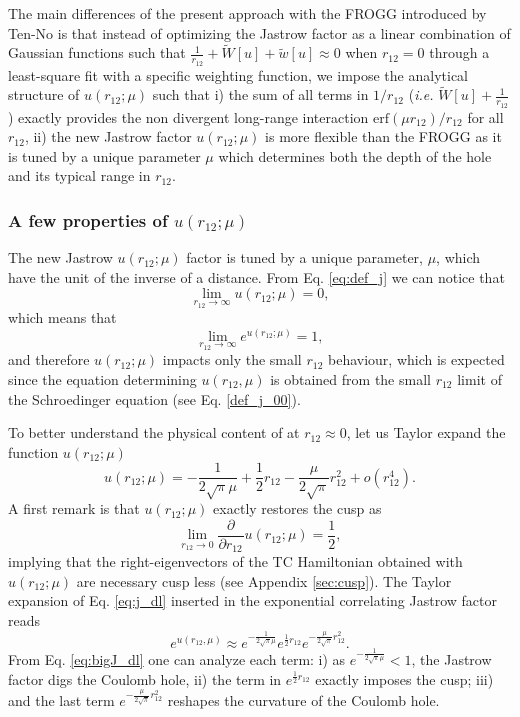 \documentclass[aip,jcp,reprint,noshowkeys,superscriptaddress,twocolumn]{revtex4-1}
\newcommand{\deriv}[3]{\frac{\partial^{#3} #1}{\partial {#2}^{#3}}}
\begin{document}
The main differences of the present approach with the FROGG introduced by Ten-No\cite{TenNo-CPL-00-a} is that instead of optimizing the Jastrow factor as a linear combination of Gaussian functions such that $\frac{1}{r_{12}}  + \tilde{W}[u] + \tilde{w}[u] \approx 0$ when $r_{12}=0$ through a least-square fit with a specific weighting function, 
we impose the analytical structure of $u(r_{12};\mu)$ such that i) the sum of all terms in $1/r_{12}$ (\textit{i.e.} $\tilde{W}[u] + \frac{1}{r_{12}}$) exactly provides the non divergent long-range interaction $\text{erf}(\mu r_{12})/r_{12}$ for all $r_{12}$, 
ii) the new Jastrow factor $u(r_{12};\mu)$ is more flexible than the FROGG as it is tuned by a unique parameter $\mu$ which determines both the depth of the hole and its typical range in $r_{12}$.  

\subsubsection{A few properties of $u(r_{12};\mu)$}
The new Jastrow $u(r_{12};\mu)$ factor is tuned by a unique parameter, $\mu$, which have the unit of the inverse of a distance. 
From Eq. \eqref{eq:def_j} we can notice that 
\begin{equation}
 \lim_{r_{12} \rightarrow \infty}u(r_{12};\mu) = 0,
\end{equation}
which means that 
\begin{equation}
 \lim_{r_{12} \rightarrow \infty}e^{u(r_{12};\mu)} = 1,
\end{equation}
and therefore $u(r_{12};\mu)$ impacts only the small $r_{12}$ behaviour,  
which is expected since the equation determining $u(r_{12},\mu)$ is obtained from the small $r_{12}$ limit of the Schroedinger equation (see Eq. \eqref{def_j_00}). 

To better understand the physical content of at $r_{12}\approx 0$,  
let us Taylor expand the function $u(r_{12};\mu)$ 
\begin{equation}
 \label{eq:j_dl}
 u(r_{12};\mu) = -\frac{1}{2\sqrt{\pi}\mu} + \frac{1}{2}r_{12} - \frac{\mu}{2\sqrt{\pi}} r_{12}^2 + o(r_{12}^4).
\end{equation}
A first remark is that $u(r_{12};\mu)$ exactly restores the cusp as
\begin{equation}
 \label{eq:cusp_phi_0}
 \lim_{r_{12}\rightarrow 0} \deriv{}{r_{12}}{}u(r_{12};\mu) = \frac{1}{2},
\end{equation}
implying that the right-eigenvectors of the TC Hamiltonian obtained with $u(r_{12};\mu)$ are necessary cusp less (see Appendix \ref{sec:cusp}). 
The Taylor expansion of Eq. \eqref{eq:j_dl} inserted in the exponential correlating Jastrow factor reads 
\begin{equation}
 \label{eq:bigJ_dl}
 e^{u(r_{12},\mu)}\approx e^{-\frac{1}{2\sqrt{\pi}\mu}} e^{ \frac{1}{2}r_{12}} e^{- \frac{\mu}{2\sqrt{\pi}} r_{12}^2}. 
\end{equation}
From Eq. \eqref{eq:bigJ_dl} one can analyze each term: i) as $e^{-\frac{1}{2\sqrt{\pi}\mu}}<1$, the Jastrow factor digs the Coulomb hole, 
ii) the term in $e^{ \frac{1}{2}r_{12}} $ exactly imposes the cusp; iii) and the last term $e^{- \frac{\mu}{2\sqrt{\pi}} r_{12}^2}$ reshapes the curvature of the Coulomb hole. 
\end{document}
